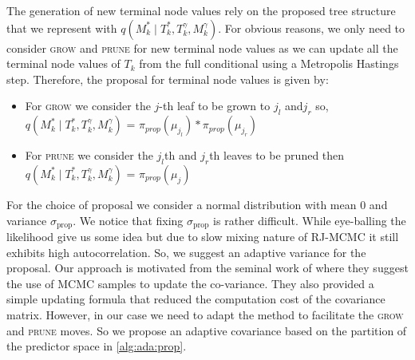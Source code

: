 \documentclass{amsart}
\begin{document}
The generation of new terminal node values rely on the proposed tree structure that we represent with $q\left(M_k^\ast\mid T_k^\ast, T_k^{\gamma}, M_k^{\gamma}\right)$. For obvious reasons, we only need to consider \textsc{grow} and \textsc{prune} for new terminal node values as we can update all the terminal node values of $T_k$ from the full conditional using a Metropolis Hastings step. Therefore, the proposal for terminal node values is given by:
\begin{itemize}
	\item For \textsc{grow} we consider the $j$-th leaf to be grown to $j_l$ and$j_r$ so,
	$q\left(M_k^\ast\mid T_k^\ast, T_k^{\gamma}, M_k^{\gamma}\right)$ = $\pi_{prop}(\mu_{j_l})*\pi_{prop}(\mu_{j_r})$
	\item For \textsc{prune} we consider the $j_l$th and $j_r$th leaves to be pruned then $q\left(M_k^\ast\mid T_k^\ast, T_k^{\gamma}, M_k^{\gamma}\right)$ = $\pi_{prop}(\mu_j)$
\end{itemize}
For the choice of proposal we consider a normal distribution with mean 0 and variance $\sigma_{\text{prop}}$. We notice that fixing $\sigma_{\text{prop}}$ is rather difficult. While eye-balling the likelihood give us some idea but due to slow mixing nature of RJ-MCMC it still exhibits high autocorrelation. So, we suggest an adaptive variance for the proposal. Our approach is motivated from the seminal work of \citet{haario_AMH} where they suggest the use of MCMC samples to update the co-variance. They also provided a simple updating formula that reduced the computation cost of the covariance matrix. However, in our case we need to adapt the method to facilitate the \textsc{grow} and \textsc{prune} moves. So we propose an adaptive covariance based on the partition of the predictor space in \cref{alg:ada:prop}.
\end{document}
